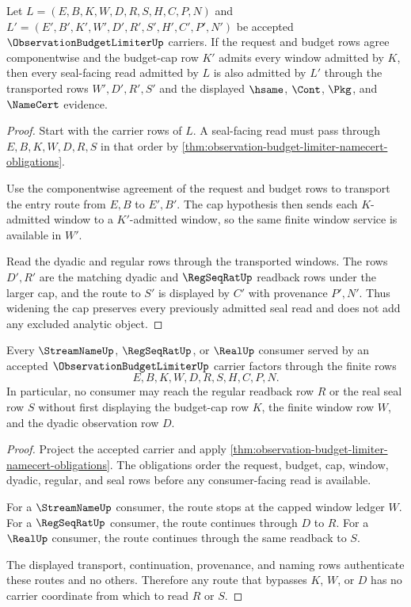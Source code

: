 \begin{theorem}
\label{thm:observation-budget-limiter-budget-monotonicity}
Let $L=(E,B,K,W,D,R,S,H,C,P,N)$ and $L'=(E',B',K',W',D',R',S',H',C',P',N')$ be accepted $\ObservationBudgetLimiterUp$ carriers. If the request and budget rows agree componentwise and the budget-cap row $K'$ admits every window admitted by $K$, then every seal-facing read admitted by $L$ is also admitted by $L'$ through the transported rows $W',D',R',S'$ and the displayed $\hsame$, $\Cont$, $\Pkg$, and $\NameCert$ evidence.
\end{theorem}
\begin{proof}
Start with the carrier rows of $L$. A seal-facing read must pass through $E,B,K,W,D,R,S$ in that order by \autoref{thm:observation-budget-limiter-namecert-obligations}.

Use the componentwise agreement of the request and budget rows to transport the entry route from $E,B$ to $E',B'$. The cap hypothesis then sends each $K$-admitted window to a $K'$-admitted window, so the same finite window service is available in $W'$.

Read the dyadic and regular rows through the transported windows. The rows $D',R'$ are the matching dyadic and $\RegSeqRatUp$ readback rows under the larger cap, and the route to $S'$ is displayed by $C'$ with provenance $P',N'$. Thus widening the cap preserves every previously admitted seal read and does not add any excluded analytic object.
\end{proof}

\begin{theorem}
\label{thm:observation-budget-limiter-window-nonescape}
Every $\StreamNameUp$, $\RegSeqRatUp$, or $\RealUp$ consumer served by an accepted $\ObservationBudgetLimiterUp$ carrier factors through the finite rows
$$
E,B,K,W,D,R,S,H,C,P,N.
$$
In particular, no consumer may reach the regular readback row $R$ or the real seal row $S$ without first displaying the budget-cap row $K$, the finite window row $W$, and the dyadic observation row $D$.
\end{theorem}
\begin{proof}
Project the accepted carrier and apply \autoref{thm:observation-budget-limiter-namecert-obligations}. The obligations order the request, budget, cap, window, dyadic, regular, and seal rows before any consumer-facing read is available.

For a $\StreamNameUp$ consumer, the route stops at the capped window ledger $W$. For a $\RegSeqRatUp$ consumer, the route continues through $D$ to $R$. For a $\RealUp$ consumer, the route continues through the same readback to $S$.

The displayed transport, continuation, provenance, and naming rows authenticate these routes and no others. Therefore any route that bypasses $K$, $W$, or $D$ has no carrier coordinate from which to read $R$ or $S$.
\end{proof}

